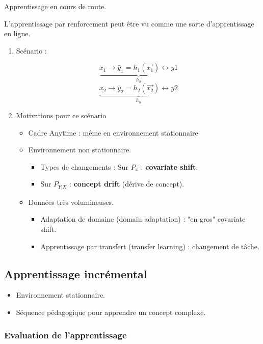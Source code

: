 \documentclass{article}
\begin{document}
Apprentissage en cours de route.

L'apprentissage par renforcement peut être vu comme une sorte d'apprentissage en ligne.

\begin{enumerate}
\item Scénario :

\[ \underbrace{x_1 \rightarrow \hat{y}_1 = h_{1}(\vec{x_1}) \leftrightarrow y1}_{h_2} \]
\[ \underbrace{x_2 \rightarrow \hat{y}_2 = h_{2}(\vec{x_2}) \leftrightarrow y2}_{h_h} \]

\item Motivations pour ce scénario
\begin{itemize}
\item Cadre Anytime : même en environnement stationnaire
\item Environnement non stationnaire.
      \begin{itemize}
      \item Types de changements : Sur $P_x$ : \textbf{covariate shift}.
      \item Sur $P_{Y|X}$ : \textbf{concept drift} (dérive de concept).
      \end{itemize}
\item Données très volumineuses.
      \begin{itemize}
      \item Adaptation de domaine (domain adaptation) : "en gros" covariate shift.
      \item Apprentissage par transfert (transfer learning) : changement de tâche.
      \end{itemize}
\end{itemize}
\end{enumerate}

\subsection{Apprentissage incrémental}

\begin{itemize}
\item Environnement stationnaire.
\item Séquence pédagogique pour apprendre un concept complexe.
\end{itemize}

\subsubsection*{Evaluation de l'apprentissage}
\end{document}
